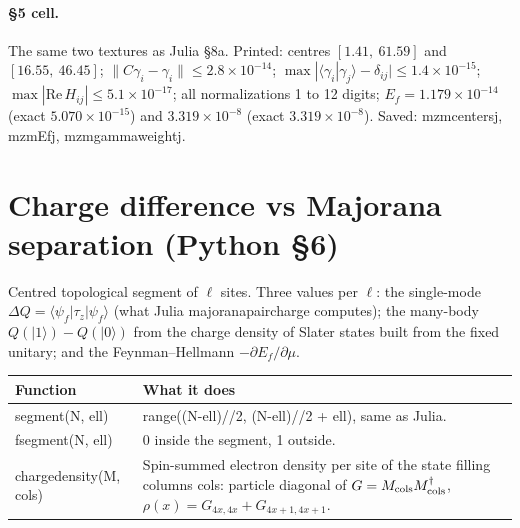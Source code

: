 \documentclass[11pt]{article}
\newcommand{\codeus}{\textunderscore\allowbreak}
\renewcommand{\code}[1]{{\ttfamily\let\_\codeus #1}}
\begin{document}
\paragraph{§5 cell.} The same two textures as Julia §8a. Printed: centres $[1.41,\ 61.59]$ and $[16.55,\ 46.45]$; $\|C\gamma_i-\gamma_i\|\le2.8\times10^{-14}$; $\max|\langle\gamma_i|\gamma_j\rangle-\delta_{ij}|\le1.4\times10^{-15}$; $\max|\mathrm{Re}\,H_{ij}|\le5.1\times10^{-17}$; all normalizations 1 to 12 digits; $E_f=1.179\times10^{-14}$ (exact $5.070\times10^{-15}$) and $3.319\times10^{-8}$ (exact $3.319\times10^{-8}$). Saved: \code{mzm\_centers\_j}, \code{mzm\_E\_f\_j}, \code{mzm\_gamma\_weight\_j}.

\section{Charge difference vs Majorana separation (Python §6)}

Centred topological segment of $\ell$ sites. Three values per $\ell$: the single-mode $\Delta Q=\langle\psi_f|\tau_z|\psi_f\rangle$ (what Julia \code{majorana\_pair\_charge} computes); the many-body $Q(|1\rangle)-Q(|0\rangle)$ from the charge density of Slater states built from the fixed unitary; and the Feynman–Hellmann $-\partial E_f/\partial\mu$.

\begin{table}[H]
\centering\small
\begin{tabularx}{\linewidth}{>{\raggedright}p{3.6cm}X}
\toprule
Function & What it does\\
\midrule
\code{segment(N, ell)} & \code{range((N-ell)//2, (N-ell)//2 + ell)}, same as Julia.\\
\code{f\_segment(N, ell)} & 0 inside the segment, 1 outside.\\
\code{charge\_density(M, cols)} & Spin-summed electron density per site of the state filling columns \code{cols}: particle diagonal of $G=M_{\rm cols}M_{\rm cols}^\dagger$, $\rho(x)=G_{4x,4x}+G_{4x+1,4x+1}$.\\
\bottomrule
\end{tabularx}
\end{table}
\end{document}
